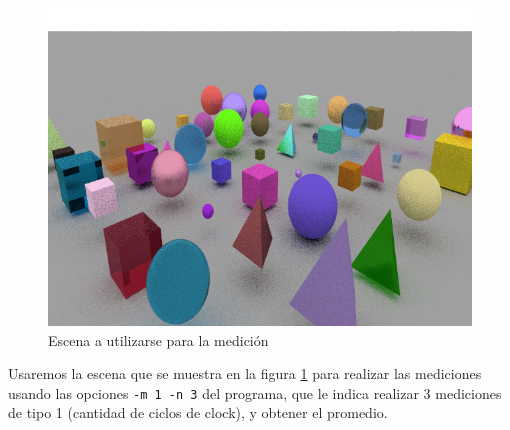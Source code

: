 \begin{figure}[H]
    \centering
    \includegraphics[width=.8\textwidth]{./imgs/exp2-scene.png}
    \caption{Escena a utilizarse para la medición}
    \label{fig:exp2-scene}
\end{figure}

Usaremos la escena que se muestra en la figura \ref{fig:exp2-scene} para
realizar las mediciones usando las opciones \texttt{-m 1 -n 3} del programa, que
le indica realizar 3 mediciones de tipo 1 (cantidad de ciclos de clock), y
obtener el promedio.

